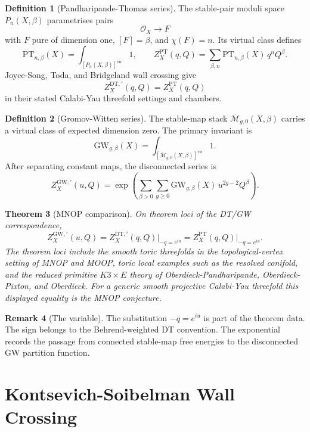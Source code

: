 \documentclass[11pt]{article}
\newtheorem{theorem}{Theorem}
\theoremstyle{definition}
\newtheorem{definition}[theorem]{Definition}
\newtheorem{remark}[theorem]{Remark}
\providecommand{\cO}{\mathcal{O}}
\providecommand{\cM}{\mathcal{M}}
\providecommand{\DT}{\mathrm{DT}}
\providecommand{\GW}{\mathrm{GW}}
\providecommand{\PT}{\mathrm{PT}}
\providecommand{\vir}{\mathrm{vir}}
\begin{document}
\begin{definition}[Pandharipande-Thomas series]
The stable-pair moduli space \(P_n(X,\beta)\) parametrises pairs
\[
  \cO_X\longrightarrow F
\]
with \(F\) pure of dimension one, \([F]=\beta\), and \(\chi(F)=n\).
Its virtual class defines
\[
  \PT_{n,\beta}(X)=\int_{[P_n(X,\beta)]^{\vir}}1,
  \qquad
  Z_X^{\PT}(q,Q)=
  \sum_{\beta,n}\PT_{n,\beta}(X)\,q^nQ^\beta .
\]
Joyce-Song, Toda, and Bridgeland wall crossing give
\[
  Z_X^{\DT,\prime}(q,Q)=Z_X^{\PT}(q,Q)
\]
in their stated Calabi-Yau threefold settings and chambers.
\end{definition}

\begin{definition}[Gromov-Witten series]
The stable-map stack \(\overline{\cM}_{g,0}(X,\beta)\) carries a virtual
class of expected dimension zero.  The primary invariant is
\[
  \GW_{g,\beta}(X)
  =
  \int_{[\overline{\cM}_{g,0}(X,\beta)]^{\vir}}1 .
\]
After separating constant maps, the disconnected series is
\[
  Z_X^{\GW,\prime}(u,Q)
  =
  \exp\!\left(
    \sum_{\beta>0}\sum_{g\ge0}
      \GW_{g,\beta}(X)\,u^{2g-2}Q^\beta
  \right).
\]
\end{definition}

\begin{theorem}[MNOP comparison]
\label{thm:mnop-comparison}
On theorem loci of the DT/GW correspondence,
\[
  Z_X^{\GW,\prime}(u,Q)
  =
  Z_X^{\DT,\prime}(q,Q)\big|_{-q=e^{iu}}
  =
  Z_X^{\PT}(q,Q)\big|_{-q=e^{iu}}.
\]
The theorem loci include the smooth toric threefolds in the
topological-vertex setting of MNOP and MOOP, toric local examples such as
the resolved conifold, and the reduced primitive \(K3\times E\) theory
of Oberdieck-Pandharipande, Oberdieck-Pixton, and Oberdieck.  For a
generic smooth projective Calabi-Yau threefold this displayed equality
is the MNOP conjecture.
\end{theorem}

\begin{remark}[The variable]
The substitution \(-q=e^{iu}\) is part of the theorem data.  The sign
belongs to the Behrend-weighted DT convention.  The exponential records
the passage from connected stable-map free energies to the disconnected
GW partition function.
\end{remark}

\section{Kontsevich-Soibelman Wall Crossing}
\end{document}
